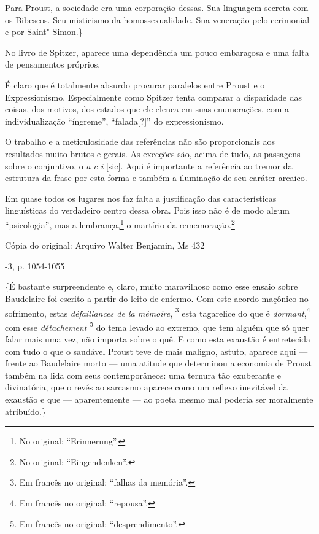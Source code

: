 Para Proust, a sociedade era uma corporação dessas. Sua linguagem
secreta com os Bibescos. Seu misticismo da homossexualidade. Sua
veneração pelo cerimonial e por Saint"-Simon.\}

No livro de Spitzer, aparece uma dependência um pouco embaraçosa e uma
falta de pensamentos próprios.

É claro que é totalmente absurdo procurar paralelos entre Proust e o
Expressionismo. Especialmente como Spitzer tenta comparar a disparidade
das coisas, dos motivos, dos estados que ele elenca em suas enumerações,
com a individualização ``íngreme'', ``falada{[}?{]}'' do expressionismo.

O trabalho e a meticulosidade das referências não são proporcionais aos
resultados muito brutos e gerais. As exceções são, acima de tudo, as
passagens sobre o conjuntivo, o \emph{a c i} {[}sic{]}. Aqui é
importante a referência ao tremor da estrutura da frase por esta forma e
também a iluminação de seu caráter arcaico.

Em quase todos os lugares nos faz falta a justificação das
características linguísticas do verdadeiro centro dessa obra. Pois isso
não é de modo algum ``psicologia'', mas a lembrança,\footnote{No
  original: ``Erinnerung''. \versal{[N. T.]}} o martírio da rememoração.\footnote{No original: ``Eingendenken''. \versal{[N. T.]}}

Cópia do original: Arquivo Walter Benjamin, Ms 432

-3, p. 1054-1055

\{É bastante surpreendente e, claro, muito maravilhoso como esse ensaio
sobre Baudelaire foi escrito a partir do leito de enfermo. Com este
acordo maçônico no sofrimento, estas \emph{défaillances de la mémoire},
\footnote{Em francês no original: ``falhas da memória''. \versal{[N. T.]}} esta
tagarelice do que é \emph{dormant},\footnote{Em francês no
  original: ``repousa''. \versal{[N. T.]}} com esse \emph{détachement} \footnote{Em francês no original: ``desprendimento''. \versal{[N. T.]}} do tema levado ao
extremo, que tem alguém que só quer falar mais uma vez, não importa
sobre o quê. E como esta exaustão é entretecida com tudo o que o
saudável Proust teve de mais maligno, astuto, aparece aqui --- frente ao
Baudelaire morto --- uma atitude que determinou a economia de Proust
também na lida com seus contemporâneos: uma ternura tão exuberante e
divinatória, que o revés ao sarcasmo aparece como um reflexo inevitável
da exaustão e que --- aparentemente --- ao poeta mesmo mal poderia ser
moralmente atribuído.\}

